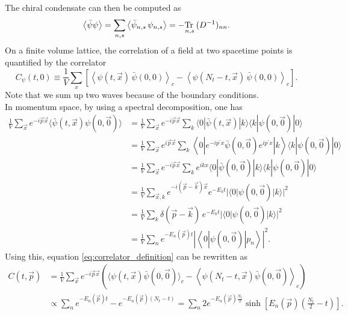 The chiral condensate can then be computed as
\begin{equation*}
    \left\langle  \bar\psi \psi \right\rangle = \underset{n,s}\sum  \left\langle \bar\psi_{n,s} \, \psi_{n,s} \right\rangle = -\underset{n,s}{\operatorname{\text{Tr} \,}} \, (D^{-1})_{nn}.
\end{equation*}
On a finite volume lattice, the correlation of a field at two spacetime points is quantified by the correlator
\begin{equation}
    C_\psi(t,0) \equiv \frac{1}{V} \sum_{x} \left[\left\langle \psi(t, \vec{x}) \, \bar\psi(0,0)\right\rangle_c - \left\langle \psi(N_t-t, \vec{x}) \, \bar\psi(0,0)\right\rangle_c \right] .
    \label{eq:correlator_definition}
\end{equation}
Note that we sum up two waves because of the boundary conditions. \\
In momentum space, by using a spectral decomposition, one has
\begin{equation*}
    \begin{aligned}
        \frac{1}{V} \sum_{\vec{x}} e^{-i \vec{p} \vec{x}}\langle\bar\psi(t, \vec{x}) \psi(0, \vec{0})\rangle & =\frac{1}{V} \sum_{\vec{x}} e^{-i \vec{p} \vec{x}} \sum_k\langle 0|\bar\psi(t, \vec{x})| k\rangle\langle k|\psi(0, \vec{0})| 0\rangle \\
        & =\frac{1}{V} \sum_{\vec{x}} e^{i \vec{p} \vec{x}} \sum_k\left\langle 0\left|e^{-i p^{\prime} x} \bar\psi(0, \vec{0}) e^{i p^{\prime} x}\right| k\right\rangle\langle k|\psi(0, \vec{0})| 0\rangle \\
        & =\frac{1}{V} \sum_{\vec{x}} e^{-i \vec{p} \vec{x}} \sum_k e^{i k x}\langle 0|\bar\psi(0, \vec{0})| k\rangle\langle k|\psi(0, \vec{0})| 0\rangle \\
        & =\frac{1}{V} \sum_{\vec{x}, k} e^{-i(\vec{p}-\vec{k}) \vec{x}} e^{-E_k t}|\langle 0|\psi(0, \vec{0})| k\rangle|^2 \\
        & =\frac{1}{V} \sum_k \delta(\vec{p}-\vec{k}) \, e^{-E_k t} |\langle 0|\psi(0, \vec{0})| k\rangle|^2 \\
        & =\frac{1}{V} \sum_n e^{-E_n(\vec{p}) t}\left|\left\langle 0|\psi(0, \vec{0})| p_n\right\rangle\right|^2.
        \end{aligned}
\end{equation*}
Using this, equation \eqref{eq:correlator_definition} can be rewritten as
\begin{equation*} 
    \begin{aligned}
        C(t, \vec{p}) & =\frac{1}{V} \sum_{\vec{x}} e^{-i \vec{p} \vec{x}}\left(\langle\psi(t, \vec{x}) \bar{\psi}(0, \vec{0})\rangle_c-\left\langle\psi\left(N_t-t, \vec{x}\right) \bar{\psi}(0, \vec{0})\right\rangle_c\right) \\
        & \propto \sum_n e^{-E_n(\vec{p}) t}-e^{-E_n(\vec{p})\left(N_t-t\right)}=\sum_n 2 e^{-E_n(\vec{p}) \frac{N_t}{2}} \sinh \left[E_n(\vec{p})\left(\frac{N_t}{2}-t\right)\right] .
    \end{aligned}
\end{equation*}

